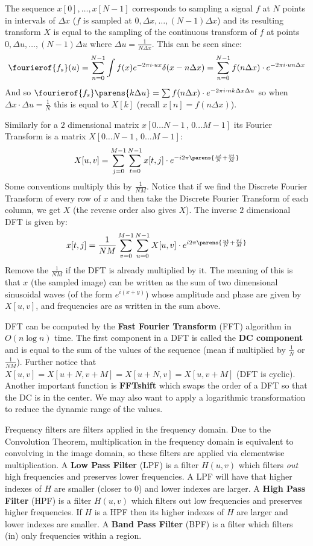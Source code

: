 \documentclass[10pt, twocolumn]{article}
\let\bold=\textbf
\begin{document}
The sequence $x[0],\dots,x[N-1]$ corresponds to sampling a signal $f$ at $N$ points in intervals of $\Delta x$ ($f$ is sampled at $0,\Delta x,\dots,(N-1)\Delta x$) and its resulting transform $X$ is equal to
the sampling of the continuous transform of $f$ at points $0,\Delta u,\dots,(N-1)\Delta u$ where $\Delta u=\frac1{N\Delta x}$.
This can be seen since:
$$ \fourierof{f_s}(u) = \sum_{n=0}^{N-1}\int f(x)e^{-2\pi i\cdot ux}\delta(x-n\Delta x) = \sum_{n=0}^{N-1} f(n\Delta x)\cdot e^{-2\pi i\cdot un\Delta x} $$
And so $\fourierof{f_s}\parens{k\Delta u}=\sum f(n\Delta x)\cdot e^{-2\pi i\cdot nk\Delta x\Delta u}$ so when $\Delta x\cdot\Delta u=\frac1N$ this is equal to $X[k]$ (recall $x[n]=f(n\Delta x)$).

Similarly for a $2$ dimensional matrix $x[0\dots N-1\,,\,0\dots M-1]$ its Fourier Transform is a matrix $X[0\dots N-1\,,\,0\dots M-1]$:
$$ X[u,v] = \sum_{j=0}^{M-1}\sum_{t=0}^{N-1}x[t,j]\cdot e^{-i2\pi\parens{\frac{ut}N+\frac{vj}M}} $$
Some conventions multiply this by $\frac1{NM}$.
Notice that if we find the Discrete Fourier Transform of every row of $x$ and then take the Discrete Fourier Transform of each column, we get $X$ (the reverse order also gives $X$).
The inverse $2$ dimensional DFT is given by:
$$ x[t,j] = \frac1{NM}\sum_{v=0}^{M-1}\sum_{u=0}^{N-1} X[u,v]\cdot e^{i2\pi\parens{\frac{ut}N+\frac{vj}M}} $$
Remove the $\frac1{NM}$ if the DFT is already multiplied by it.
The meaning of this is that $x$ (the sampled image) can be written as the sum of two dimensional sinusoidal waves (of the form $e^{i(x+y)}$) whose amplitude and phase are given by $X[u,v]$, and frequencies
are as written in the sum above.

DFT can be computed by the \bold{Fast Fourier Transform} (FFT) algorithm in $O(n\log n)$ time.
The first component in a DFT is called the \bold{DC component} and is equal to the sum of the values of the sequence (mean if multiplied by $\frac1N$ or $\frac1{NM}$).
Further notice that $X[u,v]=X[u+N,v+M]=X[u+N,v]=X[u,v+M]$ (DFT is cyclic).
Another important function is \bold{FFTshift} which swaps the order of a DFT so that the DC is in the center.
We may also want to apply a logarithmic transformation to reduce the dynamic range of the values.

Frequency filters are filters applied in the frequency domain.
Due to the Convolution Theorem, multiplication in the frequency domain is equivalent to convolving in the image domain, so these filters are applied via elementwise multiplication.
A \bold{Low Pass Filter} (LPF) is a filter $H(u,v)$ which filters \textit{out} high frequencies and preserves lower frequencies.
A LPF will have that higher indexes of $H$ are smaller (closer to $0$) and lower indexes are larger.
A \bold{High Pass Filter} (HPF) is a filter $H(u,v)$ which filters out low frequencies and preserves higher frequencies.
If $H$ is a HPF then its higher indexes of $H$ are larger and lower indexes are smaller.
A \bold{Band Pass Filter} (BPF) is a filter which filters (in) only frequencies within a region.
\end{document}
